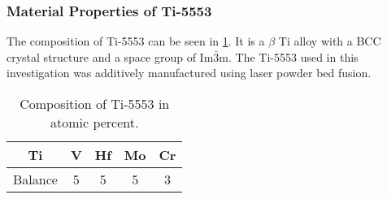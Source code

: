 \subsubsection{Material Properties of Ti-5553}
The composition of Ti-5553 can be seen in \ref{TiFi_compo}. It is a $\beta$ Ti alloy with a BCC crystal structure and a space group of Im$\bar3$m. The Ti-5553 used in this investigation was additively manufactured using laser powder bed fusion. 

\begin{table}\caption{Composition of Ti-5553 in atomic percent.}
	\label{TiFi_compo}
		\begin{center}
			\begin{tabular}{ccccc}\hline
				Ti & V & Hf & Mo & Cr \\ \hline
				Balance & 5 & 5 & 5 & 3 \\
			\end{tabular}
		\end{center}
\end{table} 
